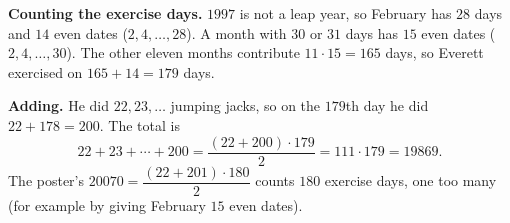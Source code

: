 \textbf{Counting the exercise days.} $1997$ is not a leap year, so February has $28$ days and $14$ even dates ($2,4,\dots,28$). A month with $30$ or $31$ days has $15$ even dates ($2,4,\dots,30$). The other eleven months contribute $11\cdot15=165$ days, so Everett exercised on $165+14=179$ days.

\textbf{Adding.} He did $22,23,\dots$ jumping jacks, so on the $179$th day he did $22+178=200$. The total is
\[
22+23+\cdots+200=\dfrac{(22+200)\cdot179}{2}=111\cdot179=\boxed{19869}.
\]
The poster's $20070=\dfrac{(22+201)\cdot180}{2}$ counts $180$ exercise days, one too many (for example by giving February $15$ even dates).
